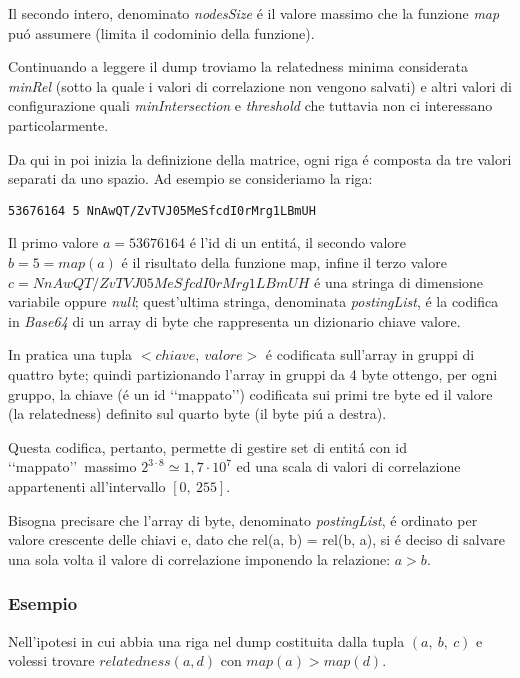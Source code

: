 Il secondo intero, denominato \textit{nodesSize} \'e il valore massimo che la funzione \textit{map} pu\'o assumere (limita il codominio della funzione).

Continuando a leggere il dump troviamo la relatedness minima considerata \textit{minRel} (sotto la quale i valori di correlazione non vengono salvati) 
e altri valori di configurazione quali \textit{minIntersection} e \textit{threshold} che tuttavia non ci interessano particolarmente.

Da qui in poi inizia la definizione della matrice, ogni riga \'e composta da tre valori separati da uno spazio. 
Ad esempio se consideriamo la riga:
\begin{lstlisting}[style=TeXStyle]
53676164 5 NnAwQT/ZvTVJ05MeSfcdI0rMrg1LBmUH
\end{lstlisting}

Il primo valore $a = 53676164$ \'e l'id di un entit\'a, il secondo valore $b = 5 = map(a)$ \'e il risultato della funzione map, 
infine il terzo valore $c = NnAwQT/ZvTVJ05MeSfcdI0rMrg1LBmUH$ \'e una stringa di dimensione variabile oppure \textit{null};
quest'ultima stringa, denominata \textit{postingList}, \'e la codifica in \textit{Base64} di un array di byte che rappresenta un dizionario chiave valore. 

In pratica una tupla $<chiave,\ valore>$ \'e codificata sull'array in gruppi di quattro byte; quindi partizionando l'array in gruppi da 4 byte 
ottengo, per ogni gruppo, la chiave (\'e un id \lq\lq mappato\rq\rq ) codificata sui primi tre byte ed il valore (la relatedness) definito sul quarto byte (il byte pi\'u a destra).

Questa codifica, pertanto, permette di gestire set di entit\'a con id \lq\lq mappato\rq\rq\ massimo $2^{3 \cdot 8} \simeq 1,7 \cdot 10^7$ ed una scala di valori 
di correlazione appartenenti all'intervallo $[0,\ 255]$.

Bisogna precisare che l'array di byte, denominato \textit{postingList}, \'e ordinato per valore crescente delle chiavi e, dato che rel(a, b) = rel(b, a),
si \'e deciso di salvare una sola volta il valore di correlazione imponendo la relazione: $a > b$.

\subsubsection{Esempio}
Nell'ipotesi in cui abbia una riga nel dump costituita dalla tupla $(a,\ b,\ c)$ e volessi trovare $relatedness(a, d)$ con $map(a) > map(d)$. 

